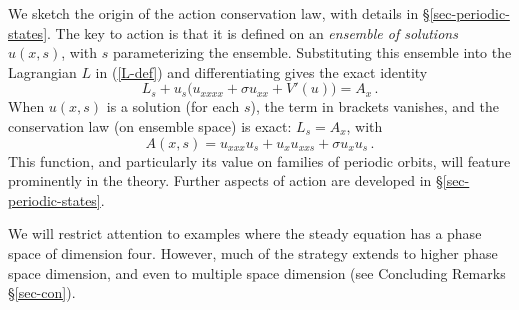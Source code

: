\documentclass[10pt]{article}
\begin{document}
We sketch the origin of the action conservation law, with details in
\S\ref{sec-periodic-states}. The key to action is that it is defined on an
\emph{ensemble of solutions} $u(x,s)$, with $s$ parameterizing the ensemble.
Substituting this ensemble into the Lagrangian $L$ in (\ref{L-def}) and
differentiating gives the exact identity
%
\begin{equation}\label{A-claw}
L_s + u_s\Big( u_{xxxx}+\sigma u_{xx} + V'(u)\Big) = A_x\,.
\end{equation}
%
When $u(x,s)$ is a solution (for each $s$), the term in brackets vanishes, and
the conservation law (on ensemble space) is exact: $L_s=A_x$, with
%
\begin{equation}\label{A-def-2}
A(x,s) = u_{xxx}u_s + u_xu_{xxs} + \sigma u_xu_s\,.
\end{equation}
%
This function, and particularly its value on families of periodic orbits, will
feature prominently in the theory. Further aspects of action are developed in
\S\ref{sec-periodic-states}.

We will restrict attention to examples where the steady equation has a phase
space of dimension four.  However, much of the strategy extends to higher phase
space dimension, and even to multiple space dimension (see Concluding Remarks
\S\ref{sec-con}).
\end{document}
